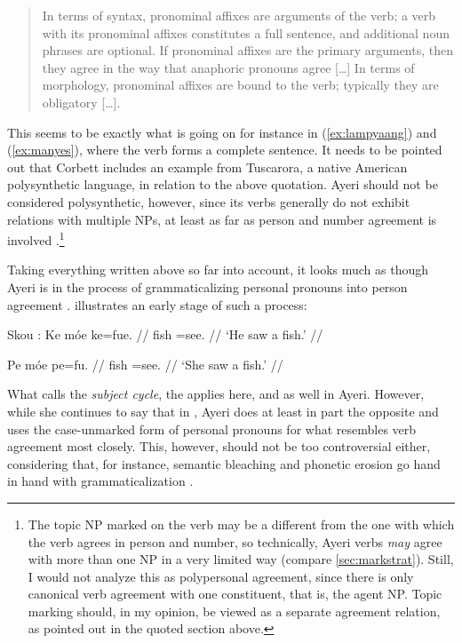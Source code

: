\blockcquote[99--100]{corbett2006}{In terms of syntax, pronominal affixes are
arguments of the verb; a verb with its pronominal affixes constitutes a full
sentence, and additional noun phrases are optional. If pronominal affixes are
the primary arguments, then they agree in the way that anaphoric pronouns agree
[…] In terms of morphology, pronominal affixes are bound to the verb; typically
they are obligatory […].}

\noindent This seems to be exactly what is going on for instance in
(\ref{ex:lampyaang}) and (\ref{ex:manyes}), where the verb forms a complete
sentence. It needs to be pointed out that Corbett includes an example from
Tuscarora, a native American polysynthetic language, in relation to the above
quotation. Ayeri should not be considered polysynthetic, however, since its
verbs generally do not exhibit relations with multiple NPs, at least as far as
person and number agreement is involved
\citep[45--46]{comrie1989}.\footnote{The topic NP marked on the verb may be a
different from the one with which the verb agrees in person and number, so
technically, Ayeri verbs \emph{may} agree with more than one NP in a very
limited way (compare \autoref{sec:markstrat}). Still, I would not analyze this
as polypersonal agreement, since there is only canonical verb agreement with
one constituent, that is, the agent NP. Topic marking should, in my opinion, be
viewed as a separate agreement relation, as pointed out in the quoted section
above.}

Taking everything written above so far into account, it looks much as though 
Ayeri is in the process of grammaticalizing personal pronouns into person 
agreement \parencites[42--45]{lehmann2015}[493--497]{vangelderen2011}. 
\citet{corbett2006} illustrates an early stage of such a process:

\pex%
Skou \parencite[76--77]{corbett2006}:
\a\begingl
	\gla Ke móe ke=fue.  //
	\glb \TsgM{} fish \TsgM{}=​see.\TsgM{} {} //
	\glft `He saw a fish.' //
\endgl

\a\begingl
	\gla Pe móe pe=fu.  //
	\glb \TsgF{} fish \TsgF{}=​see.\TsgF{} {} //
	\glft `She saw a fish.' //
\endgl

\xe

What \citet{vangelderen2011} calls the \emph{subject cycle}, the
 applies here, and as well in
Ayeri. However, while she continues to say that in
, Ayeri does at least in
part the opposite and uses the case-unmarked form of personal pronouns for
what resembles verb agreement most closely. This, however, should not be too
controversial either, considering that, for instance, semantic bleaching and
phonetic erosion go hand in hand with grammaticalization 
\parencites[136--137]{lehmann2015}[497]{vangelderen2011}.

